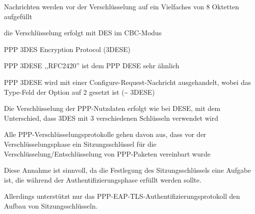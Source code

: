 \documentclass[a4paper]{article}
\begin{document}
\begin{multicols}{3}
\begin{itemize*}
\begin{itemize*}
                  \begin{itemize*}
                        \item Nachrichten werden vor der Verschlüsselung auf ein Vielfaches von 8 Oktetten aufgefüllt
                        \item die Verschlüsselung erfolgt mit DES im CBC-Modus
                  \end{itemize*}
            \end{itemize*}
            \item PPP 3DES Encryption Protocol (3DESE)
            \begin{itemize*}
                  \item PPP 3DESE ,,RFC2420'' ist dem PPP DESE sehr ähnlich
                  \item PPP 3DESE wird mit einer Configure-Request-Nachricht ausgehandelt, wobei das Type-Feld der Option auf 2 gesetzt ist (\textasciitilde{} 3DESE)
                  \item Die Verschlüsselung der PPP-Nutzdaten erfolgt wie bei DESE, mit dem Unterschied, dass 3DES mit 3 verschiedenen Schlüsseln verwendet wird
            \end{itemize*}
            \item Alle PPP-Verschlüsselungsprotokolle gehen davon aus, dass vor der
            Verschlüsselungsphase ein Sitzungsschlüssel für die
            Verschlüsselung/Entschlüsselung von PPP-Paketen vereinbart wurde
            \begin{itemize*}
                  \item Diese Annahme ist sinnvoll, da die Festlegung des Sitzungsschlüssels eine Aufgabe ist, die während der Authentifizierungsphase erfüllt werden sollte.
                  \item Allerdings unterstützt nur das PPP-EAP-TLS-Authentifizierungsprotokoll den Aufbau von Sitzungsschlüsseln.
            \end{itemize*}
      \end{itemize*}


\end{multicols}
\end{document}
